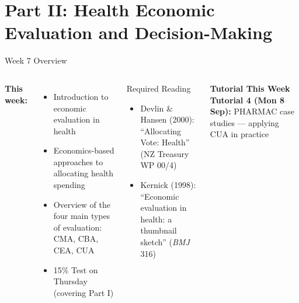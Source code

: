 \documentclass[aspectratio=169, 12pt]{beamer}
\newcommand{\tutorialbox}[1]{%
  \begin{block}{\textbf{Tutorial This Week}}
    #1
  \end{block}}
\begin{document}

\section{Part II: Health Economic Evaluation and Decision-Making}

\begin{frame}[plain]
\end{frame}

\begin{frame}{Week 7 Overview}
  \begin{columns}
      \textbf{This week:}
      \begin{itemize}
        \item Introduction to economic evaluation in health
        \item Economics-based approaches to allocating health spending
        \item Overview of the four main types of evaluation: CMA, CBA, CEA, CUA
        \item \alert{15\% Test on Thursday (covering Part I)}
      \end{itemize}
      \begin{block}{Required Reading}
        {\small
        \begin{itemize}
          \item Devlin \& Hansen (2000): ``Allocating Vote: Health'' (NZ Treasury WP 00/4)
          \item Kernick (1998): ``Economic evaluation in health: a thumbnail sketch'' (\textit{BMJ} 316)
        \end{itemize}}
      \end{block}
      \vspace{0.2em}
      \tutorialbox{\textbf{Tutorial 4 (Mon 8 Sep):} PHARMAC case studies --- applying CUA in practice}
  \end{columns}
\end{frame}
\end{document}
